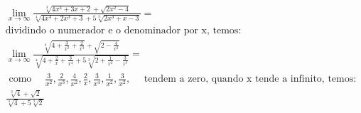\begin{ex}
\begin{align}
&\lim_{x\rightarrow \infty} \frac{\sqrt[3]{4x^3+3x+2}+\sqrt{2x^2-4}}{\sqrt[4]{4x^4+2x^3+3}+5\sqrt[3]{2x^3+x-3}}=\nonumber\\
&\text{dividindo o numerador e o denominador por x, temos:}\nonumber\\
&\lim_{x\rightarrow \infty} \frac{\sqrt[3]{4+\frac{3}{x^2}+\frac{2}{x^3}}+\sqrt{2-\frac{4}{x^2}}}{\sqrt[4]{4+\frac{2}{x}+\frac{3}{x^4}}+5\sqrt[3]{2+\frac{1}{x^2}-\frac{3}{x^3}}}=\nonumber\\
&\text{ como } \quad\frac{3}{x^2},\frac{2}{x^3},\frac{4}{x^2},\frac{2}{x},\frac{3}{x^4},\frac{1}{x^2},\frac{3}{x^2},\quad\text{ tendem a zero, quando x tende a infinito, temos: }\nonumber\\
&\frac{\sqrt[3]{4}+\sqrt{2}}{\sqrt[4]{4}+5\sqrt[3]{2}}\nonumber
\end{align}
\end{ex}